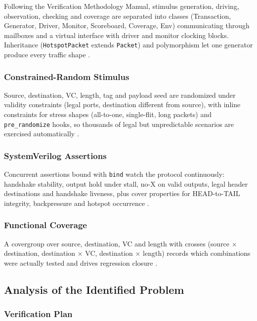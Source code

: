 \documentclass[11pt,a4paper]{report}  %
\begin{document}
Following the Verification Methodology Manual, stimulus generation, driving,
observation, checking and coverage are separated into classes (Transaction,
Generator, Driver, Monitor, Scoreboard, Coverage, Env) communicating through
mailboxes and a virtual interface with driver and monitor clocking blocks.
Inheritance (\texttt{HotspotPacket} extends \texttt{Packet}) and polymorphism
let one generator produce every traffic shape \cite{Spear}.

\subsubsection{Constrained-Random Stimulus}

Source, destination, VC, length, tag and payload seed are randomized under
validity constraints (legal ports, destination different from source), with
inline constraints for stress shapes (all-to-one, single-flit, long packets)
and \texttt{pre\_randomize} hooks, so thousands of legal but unpredictable
scenarios are exercised automatically \cite{Bergeron}.

\subsubsection{SystemVerilog Assertions}

Concurrent assertions bound with \texttt{bind} watch the protocol continuously:
handshake stability, output hold under stall, no-X on valid outputs, legal
header destinations and handshake liveness, plus cover properties for
HEAD-to-TAIL integrity, backpressure and hotspot occurrence \cite{Sutherland}.

\subsubsection{Functional Coverage}

A covergroup over source, destination, VC and length with crosses
(source $\times$ destination, destination $\times$ VC, destination $\times$
length) records which combinations were actually tested and drives regression
closure \cite{Spear}.

\subsection{Analysis of the Identified Problem}

\subsubsection{Verification Plan}
\end{document}
